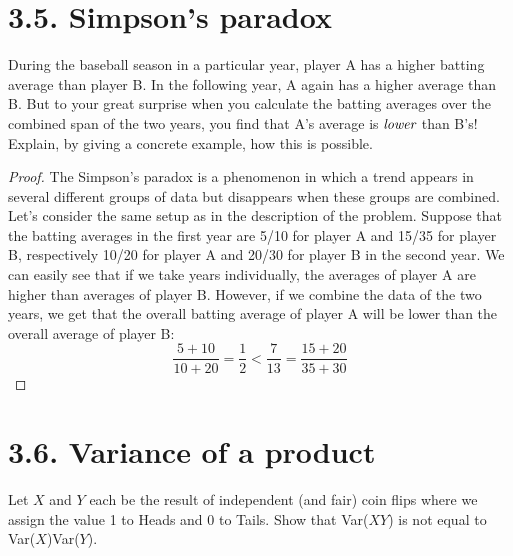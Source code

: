 \section*{3.5. Simpson's paradox}
During the baseball season in a particular year, player A has a higher batting average than player B.
In the following year, A again has a higher average than B. But to your great surprise when you 
calculate the batting averages over the combined span of the two years, you find that A's average is
$\emph{lower}$ than B's! Explain, by giving a concrete example, how this is possible.

\vspace{1em}

\begin{proof}
    The Simpson's paradox is a phenomenon in which a trend appears in several different groups of data
    but disappears when these groups are combined. Let's consider the same setup as in the description of 
    the problem. Suppose that the batting averages in the first year are 5/10 for player A and 15/35 for
    player B, respectively 10/20 for player A and 20/30 for player B in the second year. We can easily
    see that if we take years individually, the averages of player A are higher than averages of player B. 
    However, if we combine the data of the two years, we get that the overall batting average 
    of player A will be lower than the overall average of player B:
    \[
        \frac{5 + 10}{10 + 20} = \frac{1}{2} < \frac{7}{13} = \frac{15 + 20}{35 + 30}
    \] 
\end{proof}

\section*{3.6. Variance of a product}
Let $X$ and $Y$ each be the result of independent (and fair) coin flips where we assign the value
1 to Heads and 0 to Tails. Show that Var($XY$) is not equal to Var($X$)Var($Y$). 

\vspace{1em}


